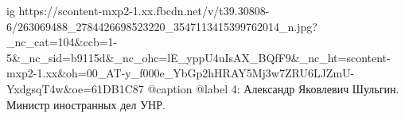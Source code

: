  
 
 
 
 

\ifcmt
  ig https://scontent-mxp2-1.xx.fbcdn.net/v/t39.30808-6/263069488_2784426698523220_3547113415399762014_n.jpg?_nc_cat=104&ccb=1-5&_nc_sid=b9115d&_nc_ohc=lE_yppU4uIsAX_BQfF9&_nc_ht=scontent-mxp2-1.xx&oh=00_AT-y_f000e_YbGp2hHRAY5Mj3w7ZRU6LJZmU-YxdgsqT4w&oe=61DB1C87
  @caption @label 4: Александр Яковлевич Шульгин. Министр иностранных дел УНР.
\fi
